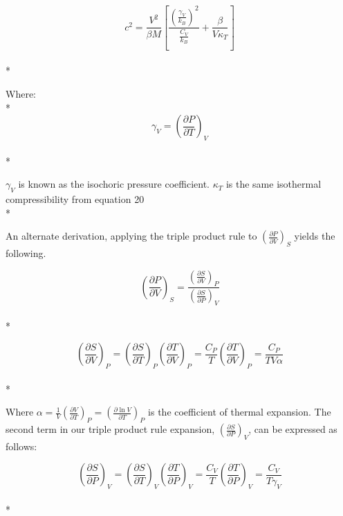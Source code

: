 \documentclass[aps,pre,nofootinbib,superscriptaddress,linenumbers,10pt, draft,tightenlines]{revtex4-1}
\begin{document}
\begin{itemize}
\begin{itemize}
        
        \begin{equation}c^2 = \frac{V^2}{\beta M}\left[\frac{\left(\frac{\gamma_V}{k_B}\right)^2}{\frac{C_V}{k_B}} + \frac{\beta}{V \kappa_T}\right]\end{equation}\\*
        
        Where:\\*
        \begin{equation}\gamma_V = \left(\frac{\partial P}{\partial T}\right)_{V}\end{equation}\\*
        
        $\gamma_V$ is known as the isochoric pressure coefficient. $\kappa_T$ is the same isothermal compressibility from equation 20\\*
        
        An alternate derivation, applying the triple product rule to $\left(\frac{\partial P}{\partial V}\right)_{S}$ yields the following.
        
        \begin{equation}\left(\frac{\partial P}{\partial V}\right)_{S} = \frac{\left(\frac{\partial S}{\partial V}\right)_{P}}{\left(\frac{\partial S}{\partial P}\right)_{V}}\end{equation}\\*
        
        \begin{equation}\left(\frac{\partial S}{\partial V}\right)_{P} = \left(\frac{\partial S}{\partial T}\right)_{P} \left(\frac{\partial T}{\partial V}\right)_{P} = \frac{C_P}{T} \left(\frac{\partial T}{\partial V}\right)_{P} = \frac{C_P}{T V \alpha}\end{equation}\\*
        
        Where $\alpha = \frac{1}{V} \left(\frac{\partial V}{\partial T}\right)_{P} = \left(\frac{\partial \ln V}{\partial T}\right)_{P}$ is the coefficient of thermal expansion. The second term in our triple product rule expansion, $\left(\frac{\partial S}{\partial P}\right)_{V}$, can be expressed as follows:
        
        \begin{equation}\left(\frac{\partial S}{\partial P}\right)_{V} = \left(\frac{\partial S}{\partial T}\right)_{V} \left(\frac{\partial T}{\partial P}\right)_{V} = \frac{C_V}{T} \left(\frac{\partial T}{\partial P}\right)_{V} = \frac{C_V}{T \gamma_V}\end{equation}\\* 
        

\end{itemize}
\end{itemize}
\end{document}
